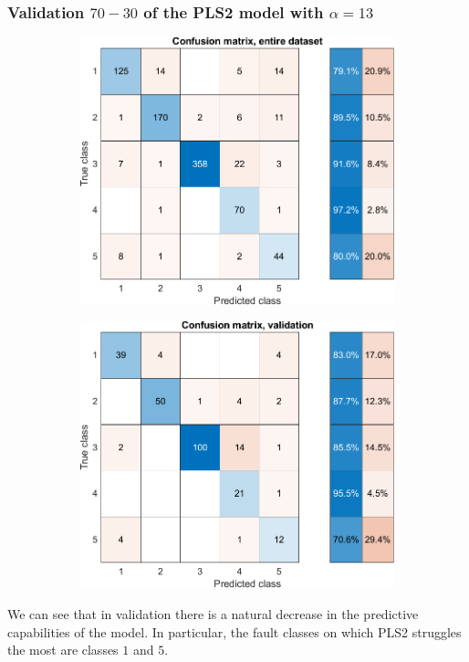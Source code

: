 \begin{frame}
	\frametitle{Validation $70-30$ of the PLS2 model with $\alpha = 13$}
	\begin{figure}
		\begin{subfigure}[b]{0.49\textwidth}
			\includegraphics[width=\textwidth]{Images/confusion_all_5_PLS2.pdf}
		\end{subfigure}
		\hfill
		\begin{subfigure}[b]{0.49\textwidth}
			\includegraphics[width=\textwidth]{Images/confusion_val_5_PLS2.pdf}
		\end{subfigure}
	\end{figure}
	We can see that in validation there is a natural decrease in the predictive capabilities of the model. In particular, the fault classes on which PLS2 struggles the most are classes $1$ and $5$.
\end{frame}

